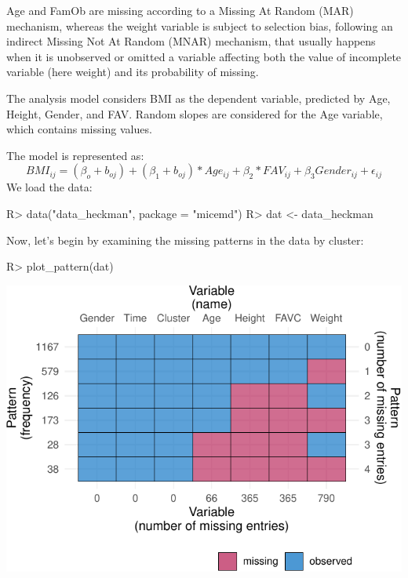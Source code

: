 \documentclass[
]{jss}
\begin{document}
Age and FamOb are missing according to a Missing At Random (MAR)
mechanism, whereas the weight variable is subject to selection bias,
following an indirect Missing Not At Random (MNAR) mechanism, that
usually happens when it is unobserved or omitted a variable affecting
both the value of incomplete variable (here weight) and its probability
of missing.

The analysis model considers BMI as the dependent variable, predicted by
Age, Height, Gender, and FAV. Random slopes are considered for the Age
variable, which contains missing values.

The model is represented as:
\[BMI_{ij}= (\beta_{o}+ b_{oj} ) + (\beta_{1}+ b_{oj})* Age_{ij} + \beta_{2}*FAV_{ij}+ \beta_{3}Gender_{ij} + \epsilon_{ij}\]
We load the data:

\begin{CodeChunk}
\begin{CodeInput}
R> data("data_heckman", package = "micemd")
R> dat <- data_heckman
\end{CodeInput}
\end{CodeChunk}

Now, let's begin by examining the missing patterns in the data by
cluster:

\begin{CodeChunk}
\begin{CodeInput}
R> plot_pattern(dat)
\end{CodeInput}


\begin{center}\includegraphics{Imputation_of_Incomplete_Multilevel_Data_files/figure-latex/obesity-md-1} \end{center}

\end{CodeChunk}
\end{document}
